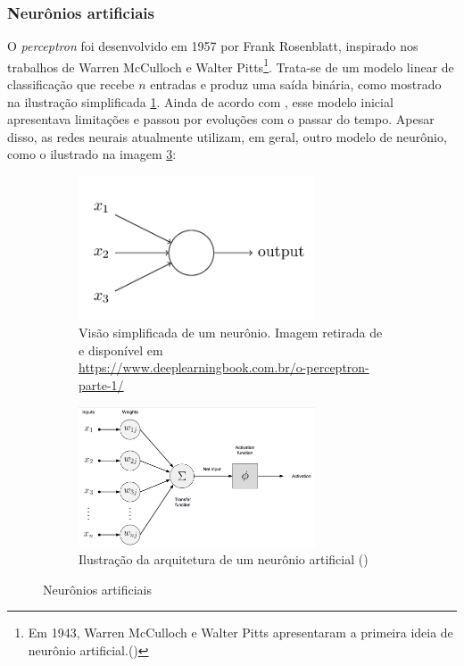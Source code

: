 \subsubsection{Neurônios artificiais}

O \textit{perceptron} foi desenvolvido em 1957 por Frank 
Rosenblatt, inspirado nos trabalhos de Warren McCulloch e Walter Pitts\footnote{Em 
1943, Warren McCulloch e Walter Pitts apresentaram a 
primeira ideia de neurônio artificial.(\cite{neuronio})}.
Trata-se de um modelo linear de classificação que 
recebe $n$ entradas e produz uma saída binária, como mostrado 
na ilustração simplificada \ref{fig:perceptron-simples}. Ainda de acordo com \citet{deeplearningbook}, esse modelo inicial apresentava limitações e passou por evoluções com o passar do 
tempo. Apesar disso, as redes neurais atualmente utilizam, em geral,
outro modelo de neurônio, como o ilustrado na imagem \ref{fig:perceptron}:


\begin{figure}[H]  
  \centering
  \begin{subfigure}{7cm}
    \centering 
    \includegraphics[width=7cm]{../figuras/perceptron-simples.png}
    \caption{Visão simplificada de um neurônio. Imagem retirada de \citet{deeplearningbook} e disponível em \url{https://www.deeplearningbook.com.br/o-perceptron-parte-1/}}
    \label{fig:perceptron-simples}
  \end{subfigure}
  \hfill
  \begin{subfigure}{7cm}
    \centering
    \includegraphics[width=7cm]{../figuras/perceptron.png}
    \caption{Ilustração da arquitetura de um 
    neurônio artificial (\citealt[][p.50]{dl-oreilly})}
    \label{fig:perceptron}
  \end{subfigure}
  \caption{Neurônios artificiais}
\end{figure}

